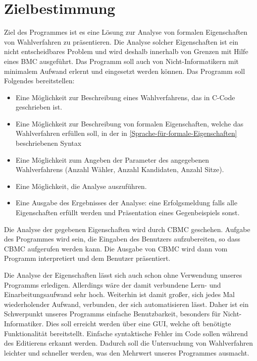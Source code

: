 \documentclass[a4paper]{scrreprt}
\begin{document}
\chapter{Zielbestimmung}
Ziel des Programmes ist es eine  Lösung zur Analyse von formalen Eigenschaften von Wahlverfahren zu präsentieren. Die Analyse solcher Eigenschaften ist ein nicht entscheidbares Problem und wird deshalb innerhalb von Grenzen mit Hilfe eines \ac{BMC} ausgeführt. Das Programm soll auch von Nicht-Informatikern mit minimalem Aufwand erlernt und eingesetzt werden können.
Das Programm soll Folgendes bereitstellen:
\begin{itemize}
\item Eine Möglichkeit zur Beschreibung eines Wahlverfahrens, das in C-Code geschrieben ist.
\item Eine Möglichkeit zur Beschreibung von formalen Eigenschaften, welche das Wahlverfahren erfüllen soll, in der in \ref{Sprache-für-formale-Eigenschaften} beschriebenen Syntax
\item Eine Möglichkeit zum Angeben der Parameter des angegebenen Wahlverfahrens (Anzahl Wähler, Anzahl Kandidaten, Anzahl Sitze).
\item Eine Möglichkeit, die Analyse auszuführen.
\item Eine Ausgabe des Ergebnisses der Analyse: eine Erfolgsmeldung falls alle Eigenschaften erfüllt werden und Präsentation eines Gegenbeispiels sonst.
\end{itemize}

Die Analyse der gegebenen Eigenschaften wird durch \ac{CBMC} geschehen. Aufgabe des Programmes wird sein, die Eingaben des \gls{Benutzer}s aufzubereiten, so dass \ac{CBMC} aufgerufen werden kann. Die Ausgabe von \ac{CBMC} wird dann vom Programm interpretiert und dem Benutzer präsentiert. 

Die Analyse der Eigenschaften lässt sich auch schon ohne Verwendung unseres Programms erledigen. Allerdings wäre der damit verbundene Lern- und Einarbeitungsaufwand sehr hoch. Weiterhin ist damit großer, sich jedes Mal wiederholender Aufwand, verbunden, der sich automatisieren lässt. Daher ist ein Schwerpunkt unseres Programms einfache Benutzbarkeit, besonders für Nicht-Informatiker. Dies soll erreicht werden über eine \ac{GUI}, welche oft benötigte Funktionalität bereitstellt. Einfache syntaktische Fehler im Code sollen während des Editierens erkannt werden. Dadurch soll die Untersuchung von Wahlverfahren leichter und schneller werden, was den Mehrwert unseres Programmes ausmacht.
\end{document}
